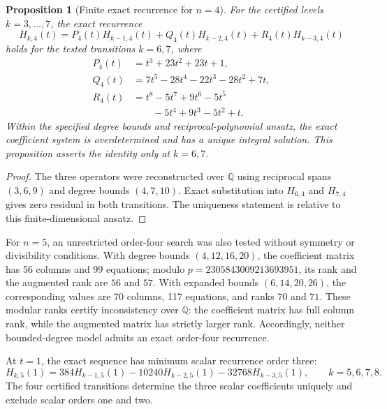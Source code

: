 \documentclass[11pt,a4paper]{article}
\newtheorem{proposition}[theorem]{Proposition}
\theoremstyle{definition}
\begin{document}
\begin{proposition}[Finite exact recurrence for $n=4$]
\label{prop:recurrence-n4}
For the certified levels $k=3,\ldots,7$, the exact recurrence
\begin{equation}\label{eq:recurrence-n4}
H_{k,4}(t)
=P_4(t)H_{k-1,4}(t)
+Q_4(t)H_{k-2,4}(t)
+R_4(t)H_{k-3,4}(t)
\end{equation}
holds for the tested transitions $k=6,7$, where
\begin{align*}
P_4(t)&=t^3+23t^2+23t+1,\\
Q_4(t)&=7t^5-28t^4-22t^3-28t^2+7t,\\
R_4(t)&=t^8-5t^7+9t^6-5t^5\\
&\qquad{}-5t^4+9t^3-5t^2+t.
\end{align*}
Within the specified degree bounds and reciprocal-polynomial ansatz,
the exact coefficient system is overdetermined and has a unique integral
solution. This proposition asserts the identity only at $k=6,7$.
\end{proposition}

\begin{proof}
The three operators were reconstructed over $\mathbb{Q}$ using reciprocal
spans $(3,6,9)$ and degree bounds $(4,7,10)$. Exact substitution into
$H_{6,4}$ and $H_{7,4}$ gives zero residual in both transitions. The
uniqueness statement is relative to this finite-dimensional ansatz.
\end{proof}

For $n=5$, an unrestricted order-four search was also tested without
symmetry or divisibility conditions. With degree bounds $(4,12,16,20)$,
the coefficient matrix has 56 columns and 99 equations; modulo
$p=2305843009213693951$, its rank and the augmented rank are $56$ and
$57$. With expanded bounds $(6,14,20,26)$, the corresponding values are
70 columns, 117 equations, and ranks $70$ and $71$. These modular ranks
certify inconsistency over $\mathbb Q$: the coefficient matrix has full
column rank, while the augmented matrix has strictly larger rank.
Accordingly, neither bounded-degree model admits an exact order-four
recurrence.

At $t=1$, the exact sequence has minimum scalar recurrence order three:
\begin{equation}\label{eq:scalar-n5}
H_{k,5}(1)=384H_{k-1,5}(1)
-10240H_{k-2,5}(1)-32768H_{k-3,5}(1),
\qquad k=5,6,7,8.
\end{equation}
The four certified transitions determine the three scalar coefficients
uniquely and exclude scalar orders one and two.
\end{document}
